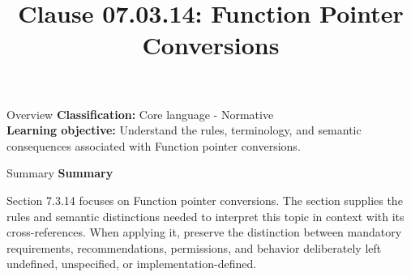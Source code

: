 \documentclass[10pt,letterpaper]{article}
\title{Clause 07.03.14: Function Pointer Conversions}
\author{}
\date{}
\begin{document}
\maketitle
\begin{CornellOverviewBox}{Overview}
\textbf{Classification:} Core language - Normative\\[2pt]
\textbf{Learning objective:} Understand the rules, terminology, and semantic consequences associated with Function pointer conversions.
\end{CornellOverviewBox}\begin{CornellSummaryBox}{Summary}
{\sffamily\bfseries\color{Accent} Summary}\par\vspace{3pt}Section 7.3.14 focuses on Function pointer conversions. The section supplies the rules and semantic distinctions needed to interpret this topic in context with its cross-references. When applying it, preserve the distinction between mandatory requirements, recommendations, permissions, and behavior deliberately left undefined, unspecified, or implementation-defined.
\end{CornellSummaryBox}
\end{document}
